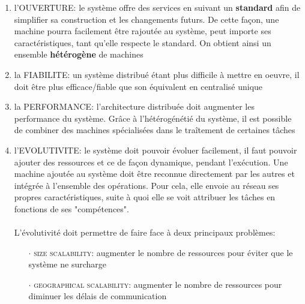 {\begin{enumerate}
\begin{itemize}
	\item[$\cdot$] \textcolor{ltred}{\textsc{concurrence entre plusieurs utilisateurs}}: un utilisateur utilise le système comme s'il était le seul, il n'a pas conscience de la présence des autres et les ressources doivent donc pouvoir être partagées entre eux
	\item[$\cdot$] \textcolor{ltred}{\textsc{panne et défaillance de ressources}}: un problème technique ne doit pas être ressenti par l'utilisateur
	\item[$\cdot$] \textcolor{ltred}{\textsc{persistence}}: cacher le fait qu'une ressource se trouve en mémoire ou sur le disque
	\end{itemize}
\item l'OUVERTURE: le système offre des services en suivant un \textbf{standard} afin de simplifier sa construction et les changements futurs. De cette façon, une machine pourra facilement être rajoutée au système, peut importe ses caractéristiques, tant qu'elle respecte le standard. On obtient ainsi un ensemble \textbf{hétérogène} de machines
\item la FIABILITE: un système distribué étant plus difficile à mettre en oeuvre, il doit être plus efficace/fiable que son équivalent en centralisé unique
\item la PERFORMANCE: l'architecture distribuée doit augmenter les performance du système. Grâce à l'hétérogénétié du système, il est possible de combiner des machines spécialisées dans le traîtement de certaines tâches
\item l'EVOLUTIVITE: le système doit pouvoir évoluer facilement, il faut pouvoir ajouter des ressources et ce de  façon dynamique, pendant l'exécution. Une machine ajoutée au système doit être reconnue directement par les autres et intégrée à l'ensemble des opérations. Pour cela, elle envoie au réseau ses propres caractéristiques, suite à quoi elle se voit attribuer les tâches en fonctions de ses "compétences".
\paragraph{}
L'évolutivité doit permettre de faire face à deux principaux problèmes: 
	\begin{itemize}
	\item[$\cdot$] \textcolor{ltred}{\textsc{size scalability}}: augmenter le nombre de ressources pour éviter que le système ne surcharge
	\item[$\cdot$] \textcolor{ltred}{\textsc{geographical scalability}}: augmenter le nombre de ressources pour diminuer les délais de communication
	\end{itemize}
\end{enumerate}

}
